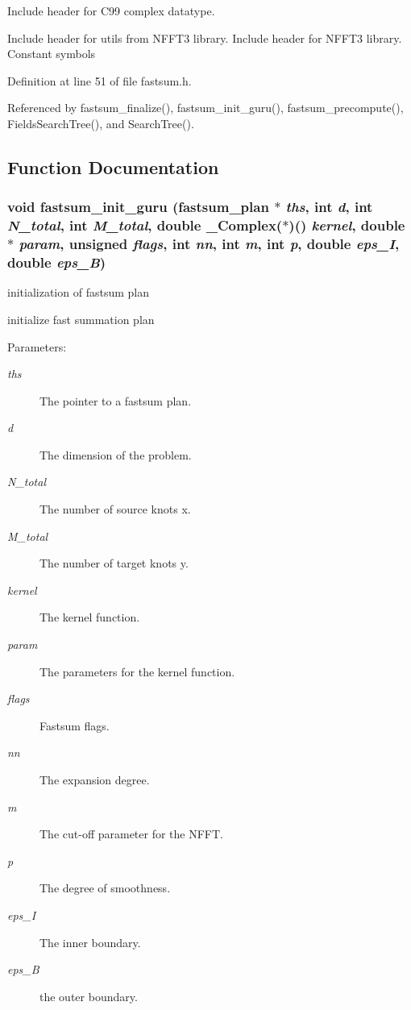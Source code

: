 Include header for C99 complex datatype. 

Include header for utils from NFFT3 library. Include header for NFFT3 library. Constant symbols 

Definition at line 51 of file fastsum.h.

Referenced by fastsum\_\-finalize(), fastsum\_\-init\_\-guru(), fastsum\_\-precompute(), FieldsSearchTree(), and SearchTree().

\subsection{Function Documentation}
\hypertarget{group__applications__fastsum_gc9d2c1acc65b11636c1080e1dd9169ad}{
\subsubsection{\setlength{\rightskip}{0pt plus 5cm}void fastsum\_\-init\_\-guru ({\bf fastsum\_\-plan} $\ast$ {\em ths}, int {\em d}, int {\em N\_\-total}, int {\em M\_\-total}, double \_\-Complex($\ast$)() {\em kernel}, double $\ast$ {\em param}, unsigned {\em flags}, int {\em nn}, int {\em m}, int {\em p}, double {\em eps\_\-I}, double {\em eps\_\-B})}}
\label{group__applications__fastsum_gc9d2c1acc65b11636c1080e1dd9169ad}


initialization of fastsum plan 

initialize fast summation plan

\begin{Desc}
\item[Parameters:]
\begin{description}
\item[{\em ths}]The pointer to a fastsum plan. \item[{\em d}]The dimension of the problem. \item[{\em N\_\-total}]The number of source knots x. \item[{\em M\_\-total}]The number of target knots y. \item[{\em kernel}]The kernel function. \item[{\em param}]The parameters for the kernel function. \item[{\em flags}]Fastsum flags. \item[{\em nn}]The expansion degree. \item[{\em m}]The cut-off parameter for the NFFT. \item[{\em p}]The degree of smoothness. \item[{\em eps\_\-I}]The inner boundary. \item[{\em eps\_\-B}]the outer boundary. \end{description}
\end{Desc}



